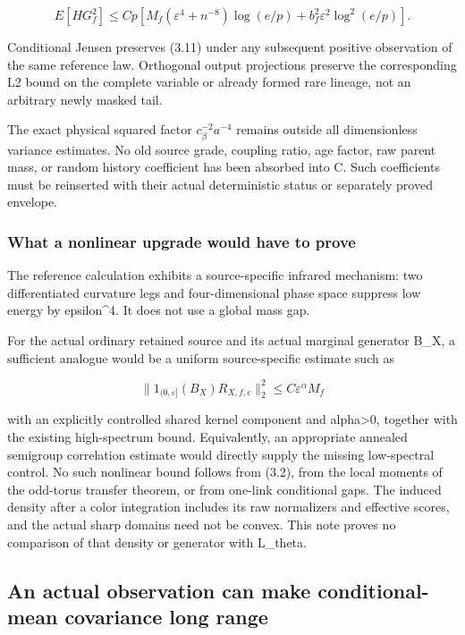 \documentclass[
  11pt,
]{article}
\begin{document}
\[
 \boxed{\quad
 E[HG_f^2]
 \le Cp\left[
 M_f(\varepsilon^4+n^{-8})\log(e/p)
 +b_f^2\varepsilon^2\log^2(e/p)
 \right].
 \quad}
\tag{3.12}
\]

Conditional Jensen preserves (3.11) under any subsequent positive
observation of the same reference law. Orthogonal output projections
preserve the corresponding L2 bound on the complete variable or already
formed rare lineage, not an arbitrary newly masked tail.

The exact physical squared factor \(c_\beta^{-2}a^{-4}\) remains outside
all dimensionless variance estimates. No old source grade, coupling
ratio, age factor, raw parent mass, or random history coefficient has
been absorbed into C. Such coefficients must be reinserted with their
actual deterministic status or separately proved envelope.

\hypertarget{what-a-nonlinear-upgrade-would-have-to-prove}{%
\subsubsection{What a nonlinear upgrade would have to
prove}\label{what-a-nonlinear-upgrade-would-have-to-prove}}

The reference calculation exhibits a source-specific infrared mechanism:
two differentiated curvature legs and four-dimensional phase space
suppress low energy by epsilon\^{}4. It does not use a global mass gap.

For the actual ordinary retained source and its actual marginal
generator B\_X, a sufficient analogue would be a uniform source-specific
estimate such as

\[
 \|1_{(0,\varepsilon]}(B_X)R_{X,f,c}\|_2^2
 \le C\varepsilon^\alpha M_f
\]

with an explicitly controlled shared kernel component and
alpha\textgreater0, together with the existing high-spectrum bound.
Equivalently, an appropriate annealed semigroup correlation estimate
would directly supply the missing low-spectral control. No such
nonlinear bound follows from (3.2), from the local moments of the odd-torus transfer theorem, or from
one-link conditional gaps. The induced density after a color integration
includes its raw normalizers and effective scores, and the actual sharp
domains need not be convex. This note proves no comparison of that
density or generator with L\_theta.

\hypertarget{an-actual-observation-can-make-conditional-mean-covariance-long-range}{%
\subsection{An actual observation can make conditional-mean covariance
long
range}\label{an-actual-observation-can-make-conditional-mean-covariance-long-range}}
\end{document}
